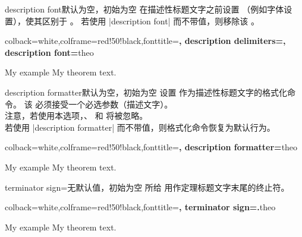 \clearpage
\begin{docTcbKey}{description font}{}{默认为空，初始为空}
  在描述性标题文字之前设置 （例如字体设置），使其区别于 。
  若使用 |description font| 而不带值，则移除该 。

\begin{dispExample}
%
  {colback=white,colframe=red!50!black,fonttitle=\bfseries,
   description delimiters={\glqq}{\grqq},
   description font=\mdseries\itshape}{theo}
\begin{sometheorem}{My example}{}
My theorem text.
\end{sometheorem}
\end{dispExample}
\end{docTcbKey}


\begin{docTcbKey}{description formatter}{}{默认为空，初始为空}
  设置  作为描述性标题文字的格式化命令。
  该  必须接受一个必选参数（描述文字）。\\
  注意，若使用本选项，、
   和  将被忽略。\\
  若使用 |description formatter| 而不带值，则格式化命令恢复为默认行为。

\begin{dispExample}

%
  {colback=white,colframe=red!50!black,fonttitle=\bfseries,
   description formatter=\formbox}{theo}
\begin{sometheorem}{My example}{}
My theorem text.
\end{sometheorem}
\end{dispExample}
\end{docTcbKey}


\begin{docTcbKey}{terminator sign}{=}{无默认值，初始为空}
  所给  用作定理标题文字末尾的终止符。

\begin{dispExample}
%
  {colback=white,colframe=red!50!black,fonttitle=\bfseries,
   terminator sign={.}}{theo}
\begin{sometheorem}{My example}{}
My theorem text.
\end{sometheorem}
\end{dispExample}
\end{docTcbKey}

